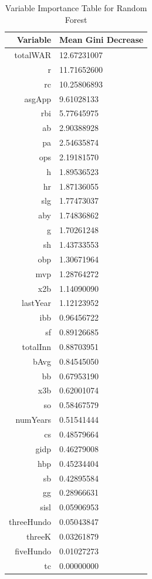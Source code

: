 \documentclass[letterpaper, 10 pt, conference]{ieeeconf}
\begin{document}
\begin{table}[ht]
\caption{Variable Importance Table for Random Forest}
\centering
\begin{tabular}{@{}rl@{}}
\toprule
Variable   & Mean Gini Decrease \\ \midrule
totalWAR   & 12.67231007        \\
r          & 11.71652600        \\
rc         & 10.25806893        \\
asgApp     & 9.61028133         \\
rbi        & 5.77645975         \\
ab         & 2.90388928         \\
pa         & 2.54635874         \\
ops        & 2.19181570         \\
h          & 1.89536523         \\
hr         & 1.87136055         \\
slg        & 1.77473037         \\
aby        & 1.74836862         \\
g          & 1.70261248         \\
sh         & 1.43733553         \\
obp        & 1.30671964         \\
mvp        & 1.28764272         \\
x2b        & 1.14090090         \\
lastYear   & 1.12123952         \\
ibb        & 0.96456722         \\
sf         & 0.89126685         \\
totalInn   & 0.88703951         \\
bAvg       & 0.84545050         \\
bb         & 0.67953190         \\
x3b        & 0.62001074         \\
so         & 0.58467579         \\
numYears   & 0.51541444         \\
cs         & 0.48579664         \\
gidp       & 0.46279008         \\
hbp        & 0.45234404         \\
sb         & 0.42895584         \\
gg         & 0.28966631         \\
sisl       & 0.05906953         \\
threeHundo & 0.05043847         \\
threeK     & 0.03261879         \\
fiveHundo  & 0.01027273         \\
tc         & 0.00000000         \\ \bottomrule
\end{tabular}
\end{table}
\end{document}
